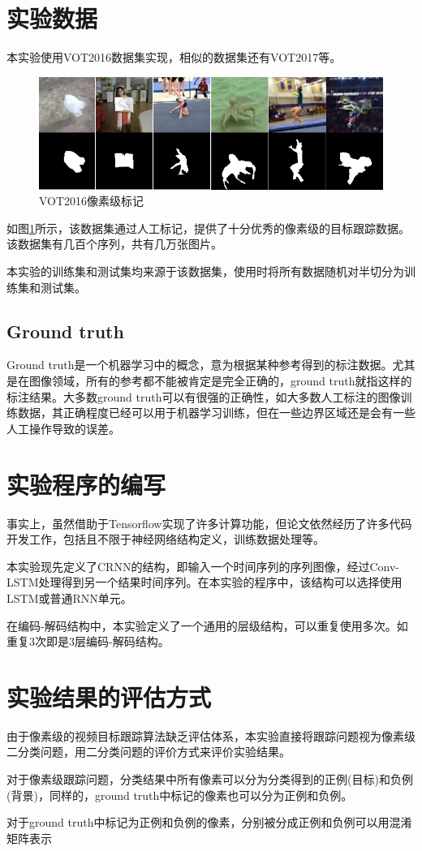 \section{实验数据}
本实验使用VOT2016数据集\supercite{Vojir-TR-2017-01}实现，相似的数据集还有VOT2017等。
\par
\begin{figure}[htbp!]
    \centering
    \includegraphics[width = 1.\textwidth]{chap/img/vot_2016_pixel.png}
    \caption{VOT2016像素级标记}\label{fig:vot_2016_pixel}
\end{figure}
\par
如图\ref{fig:vot_2016_pixel}所示，该数据集通过人工标记，提供了十分优秀的像素级的目标跟踪数据。该数据集有几百个序列，共有几万张图片。
\par
本实验的训练集和测试集均来源于该数据集，使用时将所有数据随机对半切分为训练集和测试集。
\subsection{Ground truth}
Ground truth是一个机器学习中的概念，意为根据某种参考得到的标注数据。尤其是在图像领域，所有的参考都不能被肯定是完全正确的，ground truth就指这样的标注结果。大多数ground truth可以有很强的正确性，如大多数人工标注的图像训练数据，其正确程度已经可以用于机器学习训练，但在一些边界区域还是会有一些人工操作导致的误差。

\section{实验程序的编写}
事实上，虽然借助于Tensorflow实现了许多计算功能，但论文依然经历了许多代码开发工作，包括且不限于神经网络结构定义，训练数据处理等。
\par
本实验现先定义了CRNN的结构，即输入一个时间序列的序列图像，经过Conv-LSTM处理得到另一个结果时间序列。在本实验的程序中，该结构可以选择使用LSTM或普通RNN单元。
\par
在编码-解码结构中，本实验定义了一个通用的层级结构，可以重复使用多次。如重复3次即是3层编码-解码结构。

\section{实验结果的评估方式}
由于像素级的视频目标跟踪算法缺乏评估体系，本实验直接将跟踪问题视为像素级二分类问题，用二分类问题的评价方式来评价实验结果。
\par
对于像素级跟踪问题，分类结果中所有像素可以分为分类得到的正例(目标)和负例(背景)，同样的，ground truth中标记的像素也可以分为正例和负例。
\par
对于ground truth中标记为正例和负例的像素，分别被分成正例和负例可以用混淆矩阵表示

